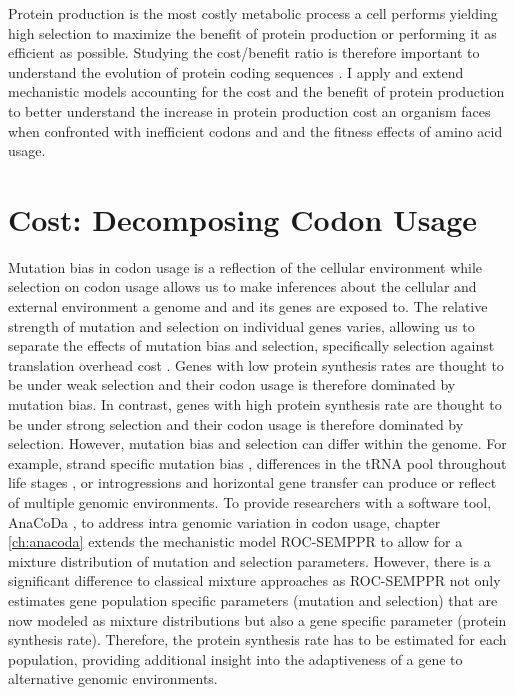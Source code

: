Protein production is the most costly metabolic process a cell performs \citep{buttgereit1995,warner1999,AkashiAndGojobori2002,lindqvist2018} yielding high selection to maximize the benefit of protein production or performing it as efficient as possible.
Studying the cost/benefit ratio is therefore important to understand the evolution of protein coding sequences \citep{gilchrist2009,ShahAndGilchrist2011,gilchrist2015,beaulieu2018}.
I apply and extend mechanistic models accounting for the cost and the benefit of protein production to better understand the increase in protein production cost an organism faces when confronted with inefficient codons and and the fitness effects of amino acid usage.


\section{Cost: Decomposing Codon Usage}

Mutation bias in codon usage is a reflection of the cellular environment while selection on codon usage allows us to make inferences about the cellular and external environment a genome and and its genes are exposed to.
The relative strength of mutation and selection on individual genes varies, allowing us to separate the effects of mutation bias and selection, specifically selection against translation overhead cost \citep{gilchrist2007,ShahAndGilchrist2011,gilchrist2015}.
Genes with low protein synthesis rates are thought to be under weak selection and their codon usage is therefore dominated by mutation bias.
In contrast, genes with high protein synthesis rate are thought to be under strong selection and their codon usage is therefore dominated by selection.
However, mutation bias and selection can differ within the genome.
For example, strand specific mutation bias \citep{Lafay1999,Romero2000}, differences in the tRNA pool throughout life stages \citep{sagi2016}, or introgressions and horizontal gene transfer \citep{medigue1991,lawrence1997} can produce or reflect of multiple genomic environments.
To provide researchers with a software tool, AnaCoDa \cite{landerer2018}, to address intra genomic variation in codon usage, chapter \ref{ch:anacoda} extends the mechanistic model ROC-SEMPPR \cite{gilchrist2015} to allow for a mixture distribution of mutation and selection parameters.
However, there is a significant difference to classical mixture approaches as ROC-SEMPPR not only estimates gene population specific parameters (mutation and selection) that are now modeled as mixture distributions but also a gene specific parameter (protein synthesis rate). 
Therefore, the protein synthesis rate has to be estimated for each population, providing additional insight into the adaptiveness of a gene to alternative genomic environments.

